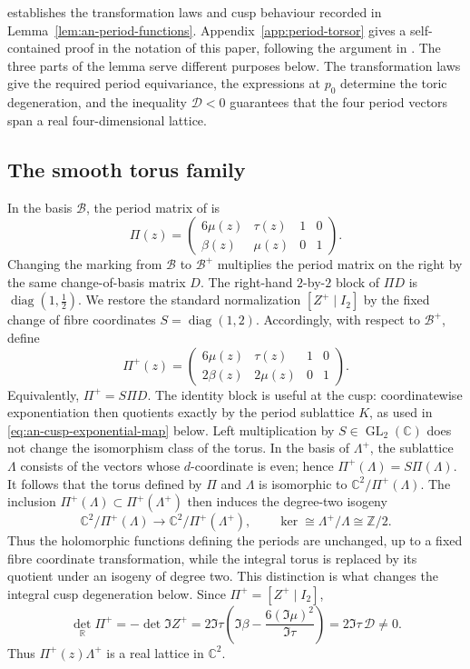 \documentclass[11pt]{article}
\theoremstyle{definition}
\theoremstyle{remark}
\numberwithin{equation}{section}
\newcommand{\CC}{\mathbb C}
\begin{document}
\citet[Theorem~3.4]{Alpoge2026} establishes the transformation laws and cusp
behaviour recorded in Lemma~\ref{lem:an-period-functions}.
Appendix~\ref{app:period-torsor} gives a self-contained proof in the notation
of this paper, following the argument in
\citep[Sections~3.1--3.4]{Alpoge2026}.
The three parts of the lemma serve different purposes below.  The
transformation laws give the required period equivariance, the expressions
at $p_0$ determine the toric degeneration, and the inequality
$\mathcal D<0$ guarantees that the four period vectors span a real
four-dimensional lattice.

\subsection{The smooth torus family}

In the basis $\mathcal B$, the period matrix of
\citep[Definition~3.3]{Alpoge2026} is
\[
 \Pi(z)=
 \begin{pmatrix}
  6\mu(z)&\tau(z)&1&0\\
  \beta(z)&\mu(z)&0&1
 \end{pmatrix}.
\]
Changing the marking from $\mathcal B$ to $\mathcal B^+$ multiplies the
period matrix on the right by the same change-of-basis matrix $D$.
The right-hand $2$-by-$2$ block of $\Pi D$ is
$\operatorname{diag}(1,\tfrac12)$.  We restore the standard normalization
$[Z^+\mid I_2]$ by the fixed change of fibre coordinates
$S=\operatorname{diag}(1,2)$.  Accordingly, with respect to
$\mathcal B^+$, define
\begin{equation}\label{eq:an-period-matrix}
 \Pi^+(z)=
 \begin{pmatrix}
 6\mu(z)&\tau(z)&1&0\\
 2\beta(z)&2\mu(z)&0&1
 \end{pmatrix}.
\end{equation}
Equivalently, $\Pi^+=S\Pi D$.
The identity block is useful at the cusp: coordinatewise exponentiation then
quotients exactly by the period sublattice $K$, as used in
\eqref{eq:an-cusp-exponential-map} below.
Left multiplication by $S\in\operatorname{GL}_2(\CC)$ does not change the
isomorphism class of the torus.  In the basis of $\Lambda^+$, the
sublattice $\Lambda$ consists of the vectors whose $d$-coordinate is
even; hence $\Pi^+(\Lambda)=S\Pi(\Lambda)$.  It follows that the torus
defined by $\Pi$ and $\Lambda$ is isomorphic to
$\mathbb C^2/\Pi^+(\Lambda)$.  The inclusion
$\Pi^+(\Lambda)\subset\Pi^+(\Lambda^+)$ then induces the degree-two
isogeny
\[
 \mathbb C^2/\Pi^+(\Lambda)
 \longrightarrow \mathbb C^2/\Pi^+(\Lambda^+),
 \qquad
 \ker\cong\Lambda^+/\Lambda\cong\mathbb Z/2.
\]
Thus the holomorphic functions defining the periods are unchanged, up to a
fixed fibre coordinate transformation, while the integral torus is replaced
by its quotient under an isogeny of degree two.  This distinction is what
changes the integral cusp degeneration below.  Since
$\Pi^+=[Z^+\mid I_2]$,
\begin{equation*}
 \det_{\mathbb R}\Pi^+
 =-\det\Im Z^+
 =2\Im\tau
   \left(\Im\beta-\frac{6(\Im\mu)^2}{\Im\tau}\right)
 =2\Im\tau\,\mathcal D\ne0.
\end{equation*}
Thus $\Pi^+(z)\Lambda^+$ is a real lattice in $\CC^2$.
\end{document}
